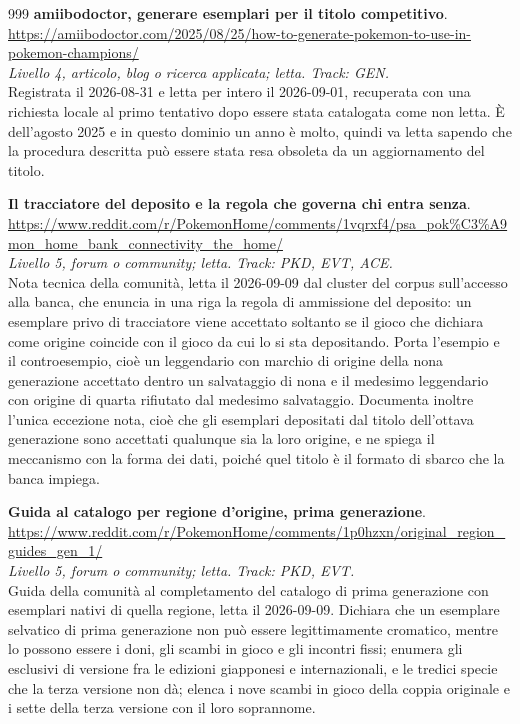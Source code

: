 \begin{thebibliography}{999}
  \textbf{amiibodoctor, generare esemplari per il titolo competitivo}.
  \\ \url{https://amiibodoctor.com/2025/08/25/how-to-generate-pokemon-to-use-in-pokemon-champions/}
  \\ \emph{Livello 4, articolo, blog o ricerca applicata; letta. Track: GEN.}
  \\ Registrata il 2026-08-31 e letta per intero il 2026-09-01, recuperata con una richiesta locale al primo tentativo dopo essere stata catalogata come non letta. È dell'agosto 2025 e in questo dominio un anno è molto, quindi va letta sapendo che la procedura descritta può essere stata resa obsoleta da un aggiornamento del titolo.

  \textbf{Il tracciatore del deposito e la regola che governa chi entra senza}.
  \\ \url{https://www.reddit.com/r/PokemonHome/comments/1vqrxf4/psa_pok\%C3\%A9mon_home_bank_connectivity_the_home/}
  \\ \emph{Livello 5, forum o community; letta. Track: PKD, EVT, ACE.}
  \\ Nota tecnica della comunità, letta il 2026-09-09 dal cluster del corpus sull'accesso alla banca, che enuncia in una riga la regola di ammissione del deposito: un esemplare privo di tracciatore viene accettato soltanto se il gioco che dichiara come origine coincide con il gioco da cui lo si sta depositando. Porta l'esempio e il controesempio, cioè un leggendario con marchio di origine della nona generazione accettato dentro un salvataggio di nona e il medesimo leggendario con origine di quarta rifiutato dal medesimo salvataggio. Documenta inoltre l'unica eccezione nota, cioè che gli esemplari depositati dal titolo dell'ottava generazione sono accettati qualunque sia la loro origine, e ne spiega il meccanismo con la forma dei dati, poiché quel titolo è il formato di sbarco che la banca impiega.

  \textbf{Guida al catalogo per regione d'origine, prima generazione}.
  \\ \url{https://www.reddit.com/r/PokemonHome/comments/1p0hzxn/original_region_guides_gen_1/}
  \\ \emph{Livello 5, forum o community; letta. Track: PKD, EVT.}
  \\ Guida della comunità al completamento del catalogo di prima generazione con esemplari nativi di quella regione, letta il 2026-09-09. Dichiara che un esemplare selvatico di prima generazione non può essere legittimamente cromatico, mentre lo possono essere i doni, gli scambi in gioco e gli incontri fissi; enumera gli esclusivi di versione fra le edizioni giapponesi e internazionali, e le tredici specie che la terza versione non dà; elenca i nove scambi in gioco della coppia originale e i sette della terza versione con il loro soprannome.


\end{thebibliography}
